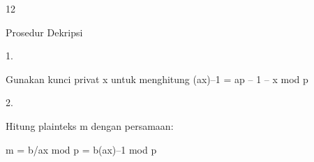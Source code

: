 \documentclass{article}
\begin{document}

12

Prosedur Dekripsi

1.

Gunakan kunci privat x untuk menghitung (ax)–1 = ap – 1 – x mod p 

2.

Hitung plainteks m dengan persamaan:


 m = b/ax mod p = b(ax)–1 mod p
\end{document}
